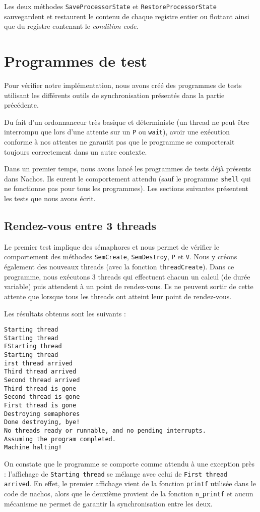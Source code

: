 \documentclass{article}
\def\fun#1{\texttt{#1}}
\begin{document}
Les deux méthodes \fun{SaveProcessorState} et \fun{RestoreProcessorState} sauvegardent et restaurent le contenu de chaque registre entier ou flottant ainsi que du registre contenant le \emph{condition code}.

\section{Programmes de test}
Pour vérifier notre implémentation, nous avons créé des programmes de tests utilisant les différents outils de synchronisation présentés dans la partie précédente.

Du fait d'un ordonnanceur très basique et déterministe (un thread ne peut être interrompu que lors d'une attente sur un \fun{P} ou \fun{wait}), avoir une exécution conforme à nos attentes ne garantit pas que le programme se comporterait toujours correctement dans un autre contexte. 

Dans un premier temps, nous avons lancé les programmes de tests déjà présents dans Nachos. Ils eurent le comportement attendu (sauf le programme \texttt{shell} qui ne fonctionne pas pour tous les programmes). Les sections suivantes présentent les tests que nous avons écrit.


\subsection{Rendez-vous entre 3 threads}
Le premier test implique des sémaphores et nous permet de vérifier le comportement des méthodes \fun{SemCreate}, \fun{SemDestroy}, \fun{P} et \fun{V}. Nous y créons également des nouveaux threads (avec la fonction \fun{threadCreate}). Dans ce programme, nous exécutons 3 threads qui effectuent chacun un calcul (de durée variable) puis attendent à un point de rendez-vous. Ils ne peuvent sortir de cette attente que lorsque  tous les threads ont atteint leur point de rendez-vous.

Les résultats obtenus sont les suivants :
\begin{lstlisting}
Starting thread
Starting thread
FStarting thread
Starting thread
irst thread arrived
Third thread arrived
Second thread arrived
Third thread is gone
Second thread is gone
First thread is gone
Destroying semaphores
Done destroying, bye!
No threads ready or runnable, and no pending interrupts.
Assuming the program completed.
Machine halting!
\end{lstlisting}

On constate que le programme se comporte comme attendu à une exception près : l'affichage de \texttt{Starting thread} se mélange avec celui de \texttt{First thread arrived}. En effet, le premier affichage vient de la fonction \fun{printf} utilisée dans le code de nachos, alors que le deuxième provient de la fonction \fun{n\_printf} et aucun mécanisme ne permet de garantir la synchronisation entre les deux.
\end{document}
